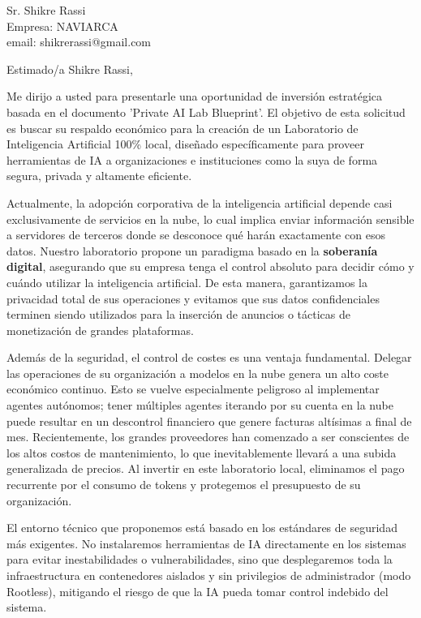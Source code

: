 \documentclass[11pt,a4paper]{letter}
\begin{document}
\begin{letter}{Sr. Shikre Rassi \\ Empresa: NAVIARCA \\email: shikrerassi@gmail.com}

\opening{Estimado/a Shikre Rassi,}

Me dirijo a usted para presentarle una oportunidad de inversión estratégica basada en el documento 'Private AI Lab Blueprint'. El objetivo de esta solicitud es buscar su respaldo económico para la creación de un Laboratorio de Inteligencia Artificial 100\% local, diseñado específicamente para proveer herramientas de IA a organizaciones e instituciones como la suya de forma segura, privada y altamente eficiente.

Actualmente, la adopción corporativa de la inteligencia artificial depende casi exclusivamente de servicios en la nube, lo cual implica enviar información sensible a servidores de terceros donde se desconoce qué harán exactamente con esos datos. Nuestro laboratorio propone un paradigma basado en la \textbf{soberanía digital}, asegurando que su empresa tenga el control absoluto para decidir cómo y cuándo utilizar la inteligencia artificial. De esta manera, garantizamos la privacidad total de sus operaciones y evitamos que sus datos confidenciales terminen siendo utilizados para la inserción de anuncios o tácticas de monetización de grandes plataformas.

Además de la seguridad, el control de costes es una ventaja fundamental. Delegar las operaciones de su organización a modelos en la nube genera un alto coste económico continuo. Esto se vuelve especialmente peligroso al implementar agentes autónomos; tener múltiples agentes iterando por su cuenta en la nube puede resultar en un descontrol financiero que genere facturas altísimas a final de mes. Recientemente, los grandes proveedores han comenzado a ser conscientes de los altos costos de mantenimiento, lo que inevitablemente llevará a una subida generalizada de precios. Al invertir en este laboratorio local, eliminamos el pago recurrente por el consumo de tokens y protegemos el presupuesto de su organización.

El entorno técnico que proponemos está basado en los estándares de seguridad más exigentes. No instalaremos herramientas de IA directamente en los sistemas para evitar inestabilidades o vulnerabilidades, sino que desplegaremos toda la infraestructura en contenedores aislados y sin privilegios de administrador (modo Rootless), mitigando el riesgo de que la IA pueda tomar control indebido del sistema. 


\end{letter}
\end{document}
